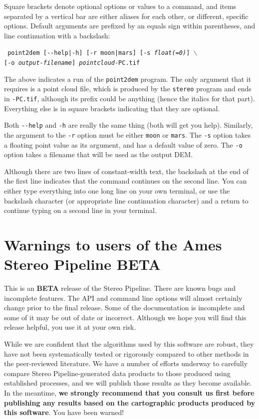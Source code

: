 Square brackets denote optional options or values to a command, and
items separated by a vertical bar are either aliases for each other, or
different, specific options.  Default arguments are prefixed by an equals
sign within parentheses, and line continuation with a backslash:

\texttt{  point2dem [-\/-help|-h] [-r moon|mars] [-s \textit{float(=0)}] $\backslash$ } \\
\hspace*{6em}\texttt{[-o \textit{output-filename}] \textit{pointcloud}-PC.tif}

The above indicates a run of the \texttt{point2dem} program.  The
only argument that it requires is a point cloud file, which is
produced by the \texttt{stereo} program and ends in \texttt{-PC.tif},
although its prefix could be anything (hence the italics for that
part).  Everything else is in square brackets indicating that they
are optional.

Both \texttt{-\/-help} and \texttt{-h} are really the same thing (both
will get you help).  Similarly, the argument to the \texttt{-r}
option must be either \texttt{moon} or \texttt{mars}.  The \texttt{-s}
option takes a floating point value as its argument, and has a
default value of zero.  The \texttt{-o} option takes a filename
that will be used as the output \ac{DEM}.

Although there are two lines of constant-width text, the backslash at the end
of the first line indicates that the command continues on the second line.  You 
can either type everything into one long line on your own terminal, or use the
backslash character (or appropriate line continuation character) and a return to 
continue typing on a second line in your terminal.


\section{Warnings to users of the Ames Stereo Pipeline BETA}

This is an {\bf BETA} release of the Stereo Pipeline.  There are
known bugs and incomplete features. The API and command line options
will almost certainly change prior to the final release.  Some of the
documentation is incomplete and some of it may be out of date or
incorrect.  Although we hope you will find this release helpful, you
use it at your own risk.

While we are confident that the algorithms used by this software are
robust, they have not been systematically tested or rigorously
compared to other methods in the peer-reviewed literature. We have a
number of efforts underway to carefully compare Stereo
Pipeline-generated data products to those produced using established
processes, and we will publish those results as they become available.
In the meantime, {\bf we strongly recommend that you consult us first
  before publishing any results based on the cartographic products
  produced by this software}. You have been warned!

